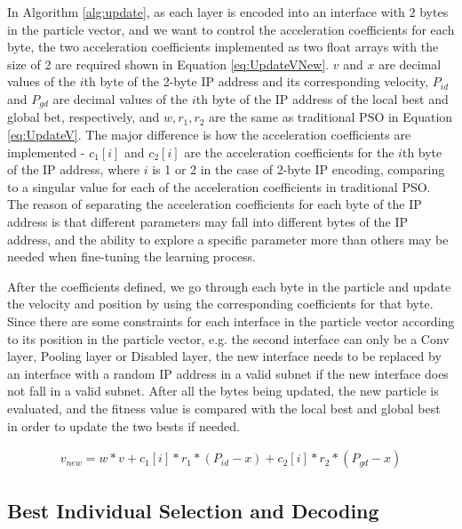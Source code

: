 \documentclass[conference]{IEEEtran}
\begin{document}
In Algorithm \ref{alg:update}, as each layer is encoded into an interface with 2 bytes in the particle vector, and we want to control the acceleration coefficients for each byte, the two acceleration coefficients implemented as two float arrays with the size of 2 are required shown in Equation \ref{eq:UpdateVNew}. $v$ and $x$ are decimal values of the $i$th byte of the 2-byte IP address and its corresponding velocity, $P_{id}$ and $P_{gd}$ are decimal values of the $i$th byte of the IP address of the local best and global bet, respectively, and $w, r_{1}, r_{2}$ are the same as traditional PSO in Equation \ref{eq:UpdateV}. The major difference is how the acceleration coefficients are implemented - $c_{1}[i]$ and $c_{2}[i]$ are the acceleration coefficients for the $i$th byte of the IP address, where $i$ is 1 or 2 in the case of 2-byte IP encoding, comparing to a singular value for each of the acceleration coefficients in traditional PSO. The reason of separating the acceleration coefficients for each byte of the IP address is that different parameters may fall into different bytes of the IP address, and the ability to explore a specific parameter more than others may be needed when fine-tuning the learning process.


After the coefficients defined, we go through each byte in the particle and update the velocity and position by using the corresponding coefficients for that byte. Since there are some constraints for each interface in the particle vector according to its position in the particle vector, e.g. the second interface can only be a Conv layer, Pooling layer or Disabled layer, the new interface needs to be replaced by an interface with a random IP address in a valid subnet if the new interface does not fall in a valid subnet. After all the bytes being updated, the new particle is evaluated, and the fitness value is compared with the local best and global best in order to update the two bests if needed.

\begin{equation}\label{eq:UpdateVNew}
\begin{aligned}
v_{new} = w * v + c_{1}[i] * r_{1} * (P_{id} - x) + c_{2}[i] * r_{2} * (P_{gd} - x)
\end{aligned}
\end{equation}


\subsection{Best Individual Selection and Decoding}
\end{document}
